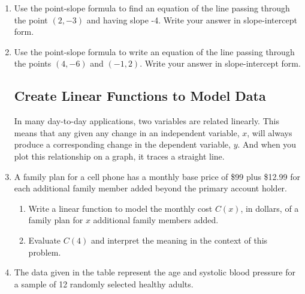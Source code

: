 \begin{enumerate}
\item Use the point-slope formula to find an equation of the line
  passing through the point $(2,-3)$ and having slope -4.  Write your
  answer in slope-intercept form.

\vfill

\item Use the point-slope formula to write an equation of the line
  passing through the points $(4,-6)$ and $(-1,2)$.  Write your answer
  in slope-intercept form.

  \vfill



\clearpage


\subsection{Create Linear Functions to Model Data}
In many day-to-day applications, two variables are related linearly.
This means that any given any change in an independent variable, $x$,
will always produce a corresponding change in the dependent variable,
$y$.  And when you plot this relationship on a graph, it traces a
straight line.

\item A family plan for a cell phone has a monthly base price of \$99
  plus \$12.99 for each additional family member added beyond the
  primary account holder.
\begin{enumerate}
\item Write a linear function to model the monthly cost $C(x)$, in
  dollars, of a family plan for $x$ additional family members added.
  \vfill
\item Evaluate $C(4)$ and interpret the meaning in the context of this
  problem.
  \vfill
\end{enumerate}



\clearpage

\item The data given in the table represent the age and systolic blood
  pressure for a sample of 12 randomly selected healthy adults.
  

\end{enumerate}
